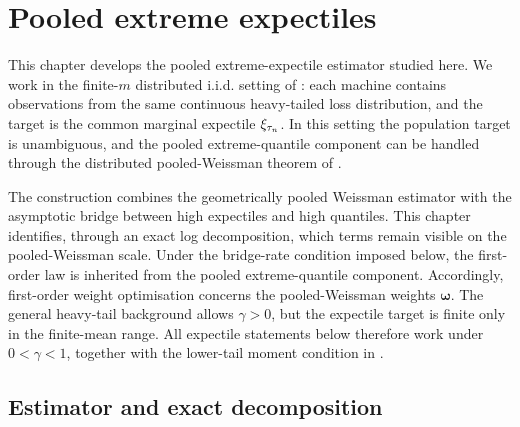 \chapter{Pooled extreme expectiles}
\label{ch:pooled-extreme}

This chapter develops the pooled extreme-expectile estimator studied here.
 We work in the finite-\(m\) distributed i.i.d. setting of
: each machine contains observations from the same
continuous heavy-tailed loss distribution, and the target is the common
marginal expectile \(\xi_{\tau_n}\). In this setting the population
target is unambiguous, and the pooled extreme-quantile component can be
handled through the distributed pooled-Weissman theorem of
\textcite[Corollary~8]{DaouiaPadoanStupfler2021}.

The construction combines the geometrically pooled Weissman estimator with the
asymptotic bridge between high expectiles and high quantiles. This chapter
identifies, through an exact log decomposition, which terms remain visible on
the pooled-Weissman scale. Under the bridge-rate condition imposed below, the
first-order law is inherited from the pooled extreme-quantile component.
Accordingly, first-order weight optimisation concerns the
pooled-Weissman weights \(\bm\omega\).
The general heavy-tail background allows \(\gamma>0\), but the expectile
target is finite only in the finite-mean range. All expectile statements below
therefore work under \(0<\gamma<1\), together with the lower-tail moment
condition in .

\section{Estimator and exact decomposition}
\label{sec:pool-ext:estimator}

